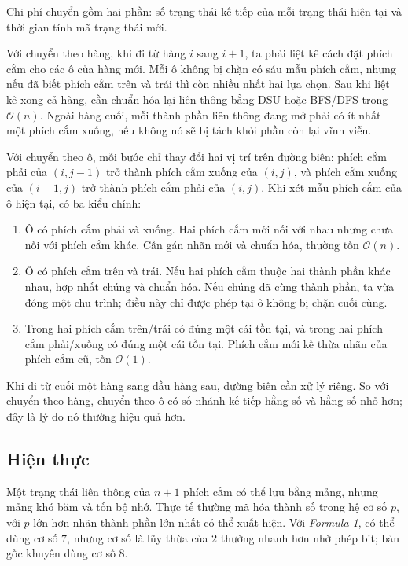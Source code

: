 \documentclass[11pt]{article}
\newcommand{\Oh}{\mathcal{O}}
\begin{document}
Chi phí chuyển gồm hai phần: số trạng thái kế tiếp của mỗi trạng thái hiện tại
và thời gian tính mã trạng thái mới.

Với chuyển theo hàng, khi đi từ hàng \(i\) sang \(i+1\), ta phải liệt kê cách
đặt phích cắm cho các ô của hàng mới. Mỗi ô không bị chặn có sáu mẫu phích
cắm, nhưng nếu đã biết phích cắm trên và trái thì còn nhiều nhất hai lựa chọn.
Sau khi liệt kê xong cả hàng, cần chuẩn hóa lại liên thông bằng DSU hoặc
BFS/DFS trong \(\Oh(n)\). Ngoài hàng cuối, mỗi thành phần liên thông đang mở
phải có ít nhất một phích cắm xuống, nếu không nó sẽ bị tách khỏi phần còn lại
vĩnh viễn.

Với chuyển theo ô, mỗi bước chỉ thay đổi hai vị trí trên đường biên: phích cắm
phải của \((i,j-1)\) trở thành phích cắm xuống của \((i,j)\), và phích cắm
xuống của \((i-1,j)\) trở thành phích cắm phải của \((i,j)\). Khi xét mẫu
phích cắm của ô hiện tại, có ba kiểu chính:
\begin{enumerate}
  \item {} Ô có phích cắm phải và xuống. Hai phích
  cắm mới nối với nhau nhưng chưa nối với phích cắm khác. Cần gán nhãn mới và
  chuẩn hóa, thường tốn \(\Oh(n)\).
  \item {} Ô có phích cắm trên và trái. Nếu hai
  phích cắm thuộc hai thành phần khác nhau, hợp nhất chúng và chuẩn hóa. Nếu
  chúng đã cùng thành phần, ta vừa đóng một chu trình; điều này chỉ được phép
  tại ô không bị chặn cuối cùng.
  \item {} Trong hai phích cắm trên/trái có đúng một
  cái tồn tại, và trong hai phích cắm phải/xuống có đúng một cái tồn tại. Phích
  cắm mới kế thừa nhãn của phích cắm cũ, tốn \(\Oh(1)\).
\end{enumerate}

Khi đi từ cuối một hàng sang đầu hàng sau, đường biên cần xử lý riêng. So với
chuyển theo hàng, chuyển theo ô có số nhánh kế tiếp hằng số và hằng số nhỏ
hơn; đây là lý do nó thường hiệu quả hơn.

\subsection{Hiện thực}

Một trạng thái liên thông của \(n+1\) phích cắm có thể lưu bằng mảng, nhưng
mảng khó băm và tốn bộ nhớ. Thực tế thường mã hóa thành số trong hệ cơ số
\(p\), với \(p\) lớn hơn nhãn thành phần lớn nhất có thể xuất hiện. Với
\textit{Formula 1}, có thể dùng cơ số \(7\), nhưng cơ số là lũy thừa của \(2\)
thường nhanh hơn nhờ phép bit; bản gốc khuyên dùng cơ số \(8\).
\end{document}
